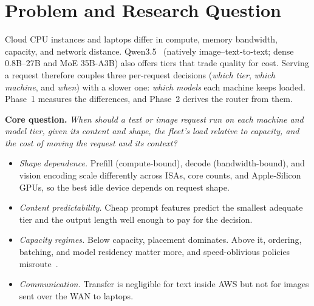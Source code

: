 \documentclass[10pt,twocolumn,letterpaper]{article}
\newcommand{\para}[1]{\textbf{#1}\hspace{0.4em}}
\begin{document}

\section{Problem and Research Question}
Cloud CPU instances and laptops differ in compute, memory bandwidth, capacity,
and network distance. Qwen3.5~\cite{qwen35} (natively image--text-to-text;
dense 0.8B--27B and MoE \mbox{35B-A3B}) also offers tiers that trade quality for cost.
Serving a request therefore couples three per-request decisions (\emph{which
tier}, \emph{which machine}, and \emph{when}) with a slower one: \emph{which
models} each machine keeps loaded. Phase~1 measures the differences, and
Phase~2 derives the router from them.

\para{Core question.} \emph{When should a text or image request run on each
machine and model tier, given its content and shape, the fleet's load relative
to capacity, and the cost of moving the request and its context?}
\begin{itemize}
\item[\textbf{H1}] \emph{Shape dependence.} Prefill (compute-bound), decode
(bandwidth-bound), and vision encoding scale differently across ISAs, core
counts, and Apple-Silicon GPUs, so the best idle device depends on request
shape.
\item[\textbf{H2}] \emph{Content predictability.} Cheap prompt features
predict the smallest adequate tier and the output length well enough to pay
for the decision.
\item[\textbf{H3}] \emph{Capacity regimes.} Below capacity, placement
dominates. Above it, ordering, batching, and model residency matter more, and
speed-oblivious policies misroute~\cite{harchol}.
\item[\textbf{H4}] \emph{Communication.} Transfer is negligible for text inside
AWS but not for images sent over the WAN to laptops.
\end{itemize}
\end{document}
